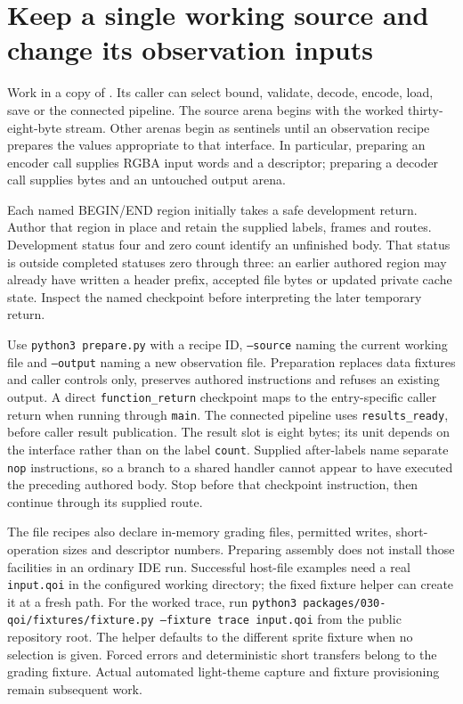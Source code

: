 \section{Keep a single working source and change its observation inputs}
Work in a copy of . Its caller can select bound,
validate, decode, encode, load, save or the connected pipeline. The source arena begins
with the worked thirty-eight-byte stream. Other arenas begin as sentinels until an
observation recipe prepares the values appropriate to that interface. In particular,
preparing an encoder call supplies RGBA input words and a descriptor; preparing a
decoder call supplies bytes and an untouched output arena.

Each named BEGIN/END region initially takes a safe development return. Author that
region in place and retain the supplied labels, frames and routes. Development status
four and zero count identify an unfinished body. That status is outside completed
statuses zero through three: an earlier authored region may already have written a
header prefix, accepted file bytes or updated private cache state. Inspect the named
checkpoint before interpreting the later temporary return.

Use \texttt{python3 prepare.py} with a recipe ID, \texttt{--source} naming the current
working file and \texttt{--output} naming a new observation file. Preparation replaces
data fixtures and caller controls only, preserves authored instructions and refuses an
existing output. A direct \texttt{function\_return} checkpoint maps to the entry-specific
caller return when running through \texttt{main}. The connected pipeline uses
\texttt{results\_ready}, before caller result publication. The result slot is eight bytes;
its unit depends on the interface rather than on the label \texttt{count}.
Supplied after-labels name separate \texttt{nop} instructions, so a branch to a shared
handler cannot appear to have executed the preceding authored body. Stop before that
checkpoint instruction, then continue through its supplied route.

The file recipes also declare in-memory grading files, permitted writes, short-operation
sizes and descriptor numbers. Preparing assembly does not install those facilities in
an ordinary IDE run. Successful host-file examples need a real \texttt{input.qoi} in
the configured working directory; the fixed fixture helper can create it at a fresh
path. For the worked trace, run \texttt{python3 packages/030-qoi/fixtures/fixture.py --fixture trace input.qoi} from the public repository root. The helper defaults to the different sprite fixture when no selection is given. Forced errors and deterministic short transfers belong to the grading fixture.
Actual automated light-theme capture and fixture provisioning remain subsequent work.

